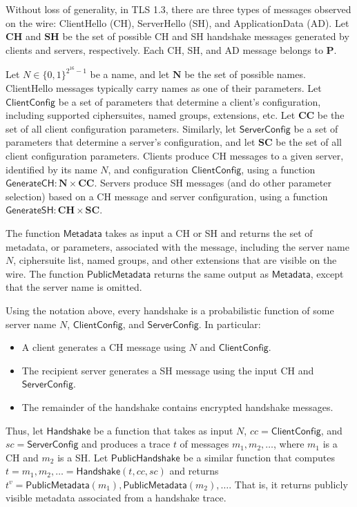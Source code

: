 \documentclass{article}
\theoremstyle{definition}
\begin{document}
Without loss of generality, in TLS 1.3, there are three types of messages observed
on the wire: ClientHello (CH), ServerHello (SH), and ApplicationData (AD). Let $\mathbf{CH}$ 
and $\mathbf{SH}$ be the set of possible CH and SH handshake messages generated by 
clients and servers, respectively. Each CH, SH, and AD message belongs to $\mathbf{P}$.




Let $N \in \{0,1\}^{2^{16} - 1}$ be a name, and let $\mathbf{N}$ be the set of possible 
names. ClientHello messages typically carry names as one of their parameters.
Let $\mathsf{ClientConfig}$ be a set of parameters that determine a client's configuration,
including supported ciphersuites, named groups, extensions, etc. 
Let $\mathbf{CC}$ be the set of all client configuration parameters.
Similarly, let $\mathsf{ServerConfig}$ be a set of parameters that determine a server's configuration,
and let $\mathbf{SC}$ be the set of all client configuration parameters.
Clients produce CH messages to a given server, identified by its name $N$, and configuration
$\mathsf{ClientConfig}$, using a function $\mathsf{GenerateCH}: \mathbf{N} \times \mathbf{CC}$.
Servers produce SH messages (and do other parameter selection) based on a CH message and 
server configuration, using a function $\mathsf{GenerateSH}: \mathbf{CH} \times \mathbf{SC}$.

The function $\mathsf{Metadata}$ takes as input a CH or SH and returns the set of metadata,
or parameters, associated with the message, including the server name $N$, ciphersuite list,
named groups, and other extensions that are visible on the wire. The function
$\mathsf{PublicMetadata}$ returns the same output as $\mathsf{Metadata}$, except that
the server name is omitted.

Using the notation above, every handshake is a probabilistic function of some server name $N$,
$\mathsf{ClientConfig}$, and $\mathsf{ServerConfig}$. In particular:
%
\begin{itemize}
    \item A client generates a CH message using $N$ and $\mathsf{ClientConfig}$.
    \item The recipient server generates a SH message using the input CH and $\mathsf{ServerConfig}$.
    \item The remainder of the handshake contains encrypted handshake messages.
\end{itemize}
%
Thus, let $\mathsf{Handshake}$ be a function that takes as input $N$,
$cc = \mathsf{ClientConfig}$, and $sc = \mathsf{ServerConfig}$ and produces 
a trace $t$ of messages $m_1, m_2, \dots$, where $m_1$ is a CH and $m_2$ is a SH.
Let $\mathsf{PublicHandshake}$ be a similar function that computes 
$t = m_1, m_2, \dots = \mathsf{Handshake}(t, cc, sc)$ 
and returns $t^v = \mathsf{PublicMetadata}(m_1), \mathsf{PublicMetadata}(m_2), \dots$. 
That is, it returns publicly visible metadata associated from a handshake trace. 
\end{document}
